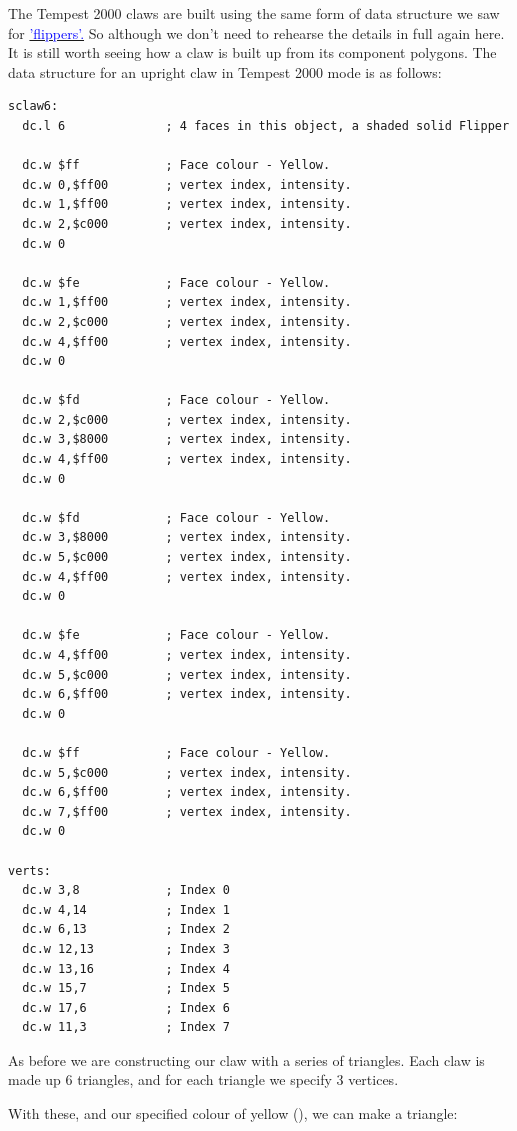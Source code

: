 The Tempest 2000 claws are built using the same form of data structure we saw for 
\hyperref[sec:flipper]{\textcolor{blue}{'flippers'.}} So although we don't need to 
rehearse the details in full again here. It is still worth seeing how a claw is built
up from its component polygons.
\clearpage
The data structure for an upright claw in Tempest 2000 mode is as follows:
\begin{lstlisting}
sclaw6:
  dc.l 6              ; 4 faces in this object, a shaded solid Flipper
    
  dc.w $ff            ; Face colour - Yellow.
  dc.w 0,$ff00        ; vertex index, intensity.
  dc.w 1,$ff00        ; vertex index, intensity.
  dc.w 2,$c000        ; vertex index, intensity.
  dc.w 0
    
  dc.w $fe            ; Face colour - Yellow.
  dc.w 1,$ff00        ; vertex index, intensity.
  dc.w 2,$c000        ; vertex index, intensity.
  dc.w 4,$ff00        ; vertex index, intensity.
  dc.w 0
    
  dc.w $fd            ; Face colour - Yellow.
  dc.w 2,$c000        ; vertex index, intensity.
  dc.w 3,$8000        ; vertex index, intensity.
  dc.w 4,$ff00        ; vertex index, intensity.
  dc.w 0
    
  dc.w $fd            ; Face colour - Yellow.
  dc.w 3,$8000        ; vertex index, intensity.
  dc.w 5,$c000        ; vertex index, intensity.
  dc.w 4,$ff00        ; vertex index, intensity.
  dc.w 0
    
  dc.w $fe            ; Face colour - Yellow.
  dc.w 4,$ff00        ; vertex index, intensity.
  dc.w 5,$c000        ; vertex index, intensity.
  dc.w 6,$ff00        ; vertex index, intensity.
  dc.w 0
    
  dc.w $ff            ; Face colour - Yellow.
  dc.w 5,$c000        ; vertex index, intensity.
  dc.w 6,$ff00        ; vertex index, intensity.
  dc.w 7,$ff00        ; vertex index, intensity.
  dc.w 0
    
verts:
  dc.w 3,8            ; Index 0
  dc.w 4,14           ; Index 1
  dc.w 6,13           ; Index 2
  dc.w 12,13          ; Index 3
  dc.w 13,16          ; Index 4
  dc.w 15,7           ; Index 5
  dc.w 17,6           ; Index 6
  dc.w 11,3           ; Index 7
\end{lstlisting}

As before we are constructing our claw with a series of triangles. Each claw
is made up 6 triangles, and for each triangle we specify 3 vertices.

With these, and our specified colour of yellow (), we can make a triangle:

